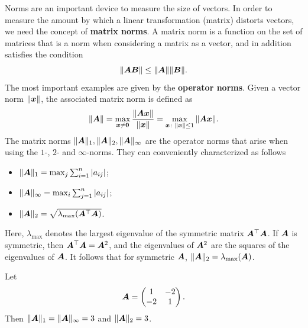 Norms are an important device to measure the size of vectors. In order to measure the amount by which a linear transformation (matrix) distorts vectors, we need the concept of
\strictpagecheck{}\textbf{matrix norms}. A matrix norm is a function on the set of matrices that is a norm when considering a matrix as a vector, and in addition satisfies the condition
\begin{equation*}
 \Vert {\bm{A}\bm{B}}\Vert\leq \Vert {\bm{A}}\Vert\Vert {\bm{B}}\Vert.
\end{equation*}
The most important examples are given by the \textbf{operator norms}. Given a vector norm $\Vert {\bm{x}}\Vert$, the associated matrix norm is defined as
\begin{equation*}
 \Vert {\bm{A}}\Vert = \max_{\bm{x}\neq \bm{0}} \frac{\Vert {\bm{A}\bm{x}}\Vert}{\Vert {\bm{x}}\Vert} = \max_{\bm{x}\colon \Vert {\bm{x}}\Vert\leq 1} \Vert {\bm{A}\bm{x}}\Vert.
\end{equation*}
The matrix norms $\Vert {\bm{A}}\Vert_1, \Vert {\bm{A}}\Vert_2, \Vert {\bm{A}}\Vert_\infty$ are the operator norms that arise when using the $1$-, $2$- and $\infty$-norms. They can conveniently characterized as follows
\begin{itemize}
 \item $\Vert {\bm{A}}\Vert_1 = \max_{j} \sum_{i=1}^n |a_{ij}|$;
 \item $\Vert {\bm{A}}\Vert_\infty = \max_{i} \sum_{j=1}^n |a_{ij}|$;
 \item $\Vert {\bm{A}}\Vert_2 = \sqrt{\lambda_{\mathrm{max}}(\bm{A}^{\top}\bm{A})}$.
\end{itemize}
Here, $\lambda_{\mathrm{max}}$ denotes the largest eigenvalue of the symmetric matrix $\bm{A}^{\top}\bm{A}$. If $\bm{A}$ is symmetric, then $\bm{A}^{\top}\bm{A}=\bm{A}^2$, and the eigenvalues of $\bm{A}^2$ are the squares of the eigenvalues of $\bm{A}$. It follows that for symmetric $\bm{A}$, $\Vert {\bm{A}}\Vert_2 = \lambda_{\mathrm{max}}(\bm{A})$.

\begin{example}
Let
\begin{equation*}
\bm{A} = \begin{pmatrix}
1 & -2\\
-2 & 1
\end{pmatrix}.
\end{equation*}
Then $\Vert {\bm{A}}\Vert_1 = \Vert {\bm{A}}\Vert_{\infty} = 3$ and $\Vert {\bm{A}}\Vert_2 = 3$.
\end{example}

